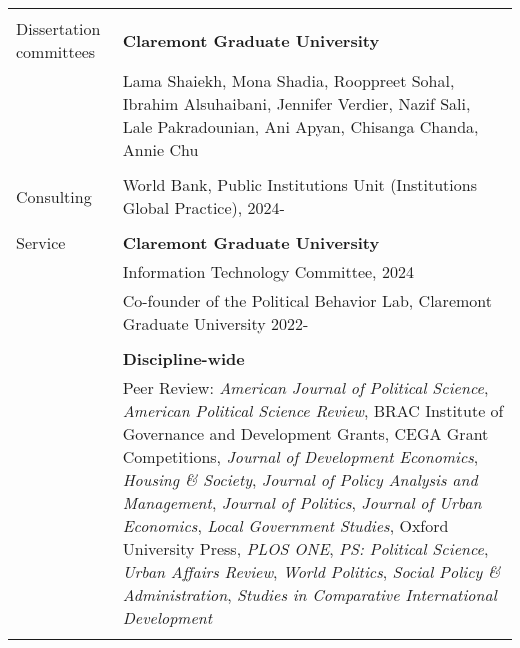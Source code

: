 \documentclass[letterpaper, 10.5pt]{article}
\begin{document}
\begin{longtable}{p{1.5in}p{5in}}
&\\

%
%
%


{{Dissertation committees}}
& \textbf{Claremont Graduate University} \\

&Lama Shaiekh, Mona Shadia, Rooppreet Sohal, Ibrahim Alsuhaibani, Jennifer Verdier, Nazif Sali, Lale Pakradounian, Ani Apyan, Chisanga Chanda, Annie Chu \\
&\\

\nohyphens{{Consulting}} & World Bank, Public Institutions Unit (Institutions Global Practice), 2024-\\

&\\


\nohyphens{{Service}} & \textbf{Claremont Graduate University} \\ & Information Technology Committee, 2024 \\
& Co-founder of the Political Behavior Lab, Claremont Graduate University 2022- \\

&\\


& \textbf{Discipline-wide} \\
&Peer Review: \textit{American Journal of Political Science}, \textit{American Political Science Review}, BRAC Institute of Governance and Development Grants, CEGA Grant Competitions, \textit{Journal of Development Economics}, \textit{Housing \& Society},
\textit{Journal of Policy Analysis and Management}, \textit{Journal of Politics}, \textit{Journal of Urban Economics}, \textit{Local Government Studies}, Oxford University Press, \textit{PLOS ONE}, \textit{PS: Political Science}, \textit{Urban Affairs Review}, \textit{World Politics}, \textit{Social Policy \& Administration}, \textit{Studies in Comparative International Development}\\ 
&\\


\end{longtable}
\end{document}
